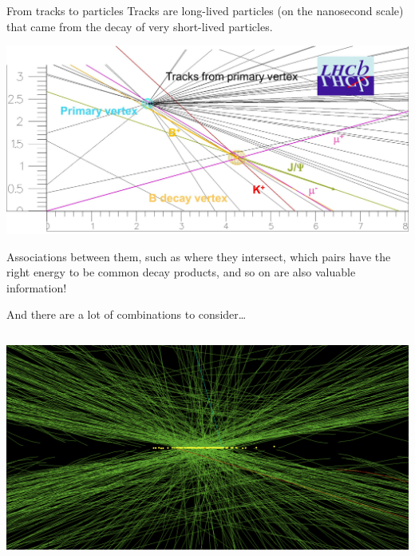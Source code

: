 \documentclass[aspectratio=169]{beamer}
\begin{document}
\begin{frame}{From tracks to particles}
\vspace{0.25 cm}
Tracks are long-lived particles (on the nanosecond scale) that came from the decay of very short-lived particles.

\vspace{-0.5 cm}
\begin{center}
\includegraphics[width=0.9\linewidth]{lhcb.png}
\end{center}

\vspace{-0.25 cm}
Associations between them, such as where they intersect, which pairs have the right energy to be common decay products, and so on are also valuable information!
\end{frame}

\begin{frame}{And there are a lot of combinations to consider\ldots}
\vspace{0.15 cm}
\begin{columns}
\includegraphics[width=\linewidth]{pileup.png}
\end{columns}
\end{frame}
\end{document}
